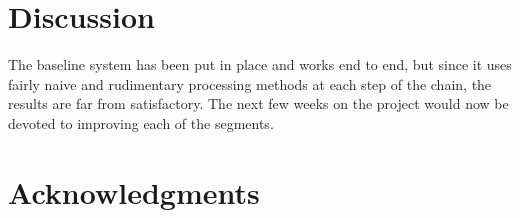 \documentclass[11pt]{article}
\begin{document}
\section{Discussion}
\label{sec:discussion}

The baseline system has been put in place and works end to end, but since it uses fairly naive and rudimentary processing methods at each step of the chain, the results are far from satisfactory. The next few weeks on the project would now be devoted to improving each of the segments. 
\section*{Acknowledgments}


\printbibliography 
\end{document}
